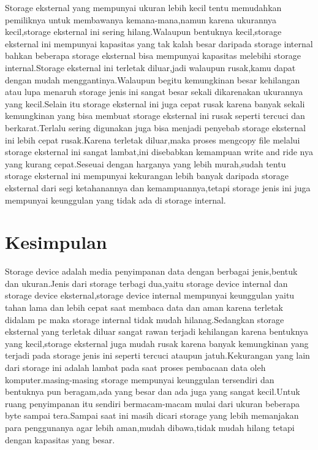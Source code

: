 Storage eksternal yang mempunyai ukuran lebih kecil tentu memudahkan pemiliknya untuk membawanya kemana-mana,namun karena ukurannya kecil,storage eksternal ini sering hilang.Walaupun bentuknya kecil,storage eksternal ini mempunyai kapasitas yang tak kalah besar daripada storage internal bahkan beberapa storage eksternal bisa mempunyai kapasitas melebihi storage internal.Storage eksternal ini terletak diluar,jadi walaupun rusak,kamu dapat dengan mudah menggantinya.Walaupun begitu kemungkinan besar kehilangan atau lupa menaruh storage jenis ini sangat besar sekali dikarenakan ukurannya yang kecil.Selain itu storage eksternal ini juga cepat rusak karena banyak sekali kemungkinan yang bisa membuat storage eksternal ini rusak seperti tercuci dan berkarat.Terlalu sering digunakan juga bisa menjadi penyebab storage eksternal ini lebih cepat rusak.Karena terletak diluar,maka proses mengcopy file melalui storage eksternal ini sangat lambat,ini disebabkan kemampuan write and ride nya yang kurang cepat.Seseuai dengan harganya yang lebih murah,sudah tentu storage eksternal ini mempunyai kekurangan lebih banyak daripada storage eksternal dari segi ketahanannya dan kemampuannya,tetapi storage jenis ini juga mempunyai keunggulan yang tidak ada di storage internal.

\section{Kesimpulan}

Storage device adalah media penyimpanan data dengan berbagai jenis,bentuk dan ukuran.Jenis dari storage terbagi dua,yaitu storage device internal dan storage device eksternal,storage device internal mempunyai keunggulan yaitu tahan lama dan lebih cepat saat membaca data dan aman karena terletak didalam pc maka storage internal tidak mudah hilanag.Sedangkan storage eksternal yang terletak diluar sangat rawan terjadi kehilangan karena bentuknya yang kecil,storage eksternal juga mudah rusak karena banyak kemungkinan yang terjadi pada storage jenis ini seperti tercuci ataupun jatuh.Kekurangan yang lain dari storage ini adalah lambat pada saat proses pembacaan data oleh komputer.masing-masing storage mempunyai keunggulan tersendiri dan bentuknya pun beragam,ada yang besar dan ada juga yang sangat kecil.Untuk ruang penyimpanan itu sendiri bermacam-macam mulai dari ukuran beberapa byte sampai tera.Sampai saat ini masih dicari storage yang lebih memanjakan para penggunanya agar lebih aman,mudah dibawa,tidak mudah hilang tetapi dengan kapasitas yang besar.



